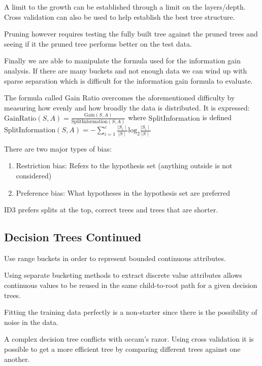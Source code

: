 \documentclass{article}
\begin{document}
A limit to the growth can be established through a limit on the layers/depth. 
Cross validation can also be used to help establish the best tree structure.

Pruning however requires testing the fully built tree against the pruned trees 
and seeing if it the pruned tree performs better on the test data. 

Finally we are able to manipulate the formula used for the information gain
analysis. If there are many buckets and not enough data we can wind up with
sparse separation which is difficult for the information gain formula to 
evaluate.

The formula called Gain Ratio overcomes the aforementioned difficulty by
measuring how evenly and how broadly the data is distributed. It is expressed:
$\text{GainRatio}(S,A) = \frac{\text{Gain}(S,A)}{\text{SplitInformation}(S,A)}$
where $\text{SplitInformation}$ is defined
$\text{SplitInformation}(S,A) = - \sum_{i = 1}^c\frac{\mid S_i\mid}{\mid S\mid}
\text{log}_2\frac{\mid S_i\mid}{\mid S\mid}$

There are two major types of bias:

\begin{enumerate}
	\item Restriction bias: Refers to the hypothesis set (anything outside
	is not considered)
	\item Preference bias: What hypotheses in the hypothesis set are
	preferred
\end{enumerate}

ID3 prefers splits at the top, correct trees and trees that are shorter. 

\subsection{Decision Trees Continued}
 
Use range buckets in order to represent bounded continuous attributes.

Using separate bucketing methods to extract discrete value attributes allows
continuous values to be reused in the same child-to-root path for a given 
decision trees. 

Fitting the training data perfectly is a non-starter since there is the
possibility of noise in the data. 

A complex decision tree conflicts with occam's razor. Using cross validation it 
is possible to get a more efficient tree by comparing different trees against 
one another. 
\end{document}
